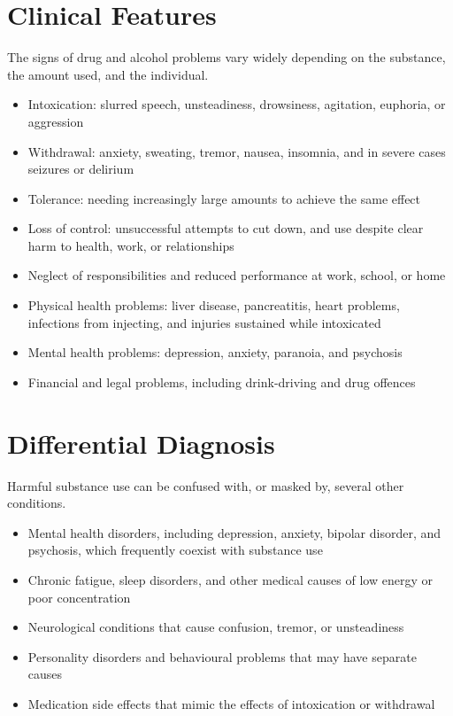 \section*{Clinical Features}
The signs of drug and alcohol problems vary widely depending on the substance, the amount used, and the individual.
\begin{itemize}
    \item Intoxication: slurred speech, unsteadiness, drowsiness, agitation, euphoria, or aggression
    \item Withdrawal: anxiety, sweating, tremor, nausea, insomnia, and in severe cases seizures or delirium
    \item Tolerance: needing increasingly large amounts to achieve the same effect
    \item Loss of control: unsuccessful attempts to cut down, and use despite clear harm to health, work, or relationships
    \item Neglect of responsibilities and reduced performance at work, school, or home
    \item Physical health problems: liver disease, pancreatitis, heart problems, infections from injecting, and injuries sustained while intoxicated
    \item Mental health problems: depression, anxiety, paranoia, and psychosis
    \item Financial and legal problems, including drink-driving and drug offences
\end{itemize}

\section*{Differential Diagnosis}
Harmful substance use can be confused with, or masked by, several other conditions.
\begin{itemize}
    \item Mental health disorders, including depression, anxiety, bipolar disorder, and psychosis, which frequently coexist with substance use
    \item Chronic fatigue, sleep disorders, and other medical causes of low energy or poor concentration
    \item Neurological conditions that cause confusion, tremor, or unsteadiness
    \item Personality disorders and behavioural problems that may have separate causes
    \item Medication side effects that mimic the effects of intoxication or withdrawal
\end{itemize}

